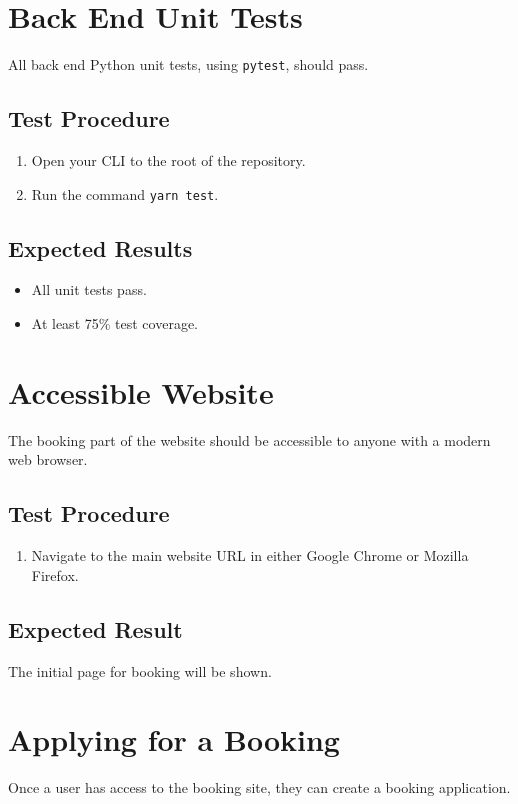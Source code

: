 \documentclass[a4paper, draft]{article}
\begin{document}
\section{Back End Unit Tests}
All back end Python unit tests, using \texttt{pytest}, should pass.

\subsection{Test Procedure}
\begin{enumerate}
    \item Open your CLI to the root of the repository.
    \item Run the command \texttt{yarn test}.
\end{enumerate}

\subsection{Expected Results}
\begin{itemize}
    \item All unit tests pass.
    \item At least 75\% test coverage.
\end{itemize}

\newpage
\section{Accessible Website}
The booking part of the website should be accessible to anyone with a modern web browser.

\subsection{Test Procedure}
\begin{enumerate}
    \item Navigate to the main website URL in either Google Chrome or Mozilla Firefox.
\end{enumerate}

\subsection{Expected Result}
The initial page for booking will be shown.

\section{Applying for a Booking}
Once a user has access to the booking site, they can create a booking application.
\end{document}

